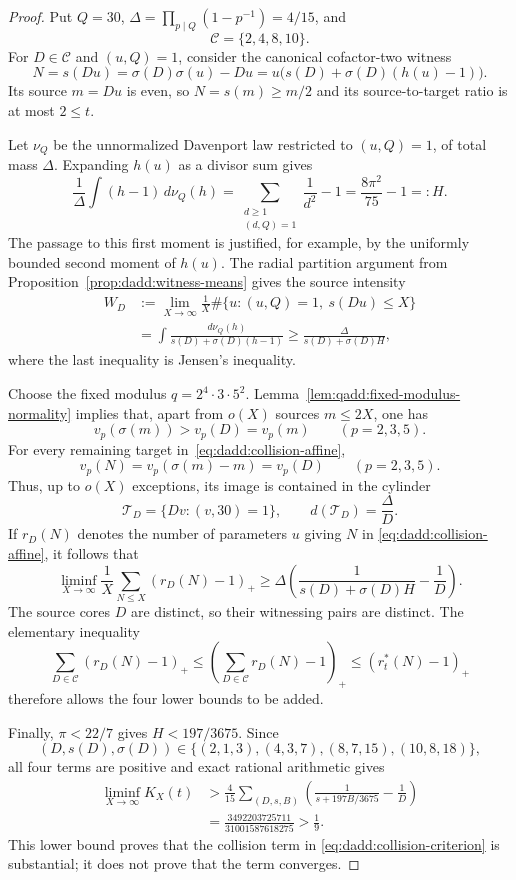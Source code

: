 \begin{proof}
Put $Q=30$, $\Delta=\prod_{p\mid Q}(1-p^{-1})=4/15$, and
\[
 \mathcal C=\{2,4,8,10\}.
\]
For $D\in\mathcal C$ and $(u,Q)=1$, consider the canonical
cofactor-two witness
\begin{equation}
\label{eq:dadd:collision-affine}
 N=s(Du)=\sigma(D)\sigma(u)-Du
        =u\bigl(s(D)+\sigma(D)(h(u)-1)\bigr).
\end{equation}
Its source $m=Du$ is even, so $N=s(m)\geq m/2$ and its
source-to-target ratio is at most $2\leq t$.

Let $\nu_Q$ be the unnormalized Davenport law restricted to
$(u,Q)=1$, of total mass $\Delta$. Expanding $h(u)$ as a divisor
sum gives
\[
 \frac1\Delta\int(h-1)\,d\nu_Q(h)
 =\sum_{\substack{d\geq1\\(d,Q)=1}}\frac1{d^2}-1
 =\frac{8\pi^2}{75}-1=:H.
\]
The passage to this first moment is justified, for example, by
the uniformly bounded second moment of $h(u)$. The radial
partition argument from Proposition~\ref{prop:dadd:witness-means}
gives the source intensity
\begin{align*}
 W_D
 &:=\lim_{X\to\infty}\frac1X
       \#\{u:(u,Q)=1,\ s(Du)\leq X\}\\
 &=\int\frac{d\nu_Q(h)}{s(D)+\sigma(D)(h-1)}
 \geq\frac{\Delta}{s(D)+\sigma(D)H},
\end{align*}
where the last inequality is Jensen's inequality.

Choose the fixed modulus $q=2^4\cdot3\cdot5^2$.
Lemma~\ref{lem:qadd:fixed-modulus-normality} implies that, apart
from $o(X)$ sources $m\leq2X$, one has
\[
 v_p(\sigma(m))>v_p(D)=v_p(m)
 \qquad(p=2,3,5).
\]
For every remaining target in~\eqref{eq:dadd:collision-affine},
\[
 v_p(N)=v_p(\sigma(m)-m)=v_p(D)
 \qquad(p=2,3,5).
\]
Thus, up to $o(X)$ exceptions, its image is contained in the
cylinder
\[
 \mathcal T_D=\{Dv:(v,30)=1\},
 \qquad d(\mathcal T_D)=\frac\Delta D.
\]
If $r_D(N)$ denotes the number of parameters $u$ giving $N$ in
\eqref{eq:dadd:collision-affine}, it follows that
\[
 \liminf_{X\to\infty}\frac1X
       \sum_{N\leq X}(r_D(N)-1)_+
 \geq\Delta\left(
      \frac1{s(D)+\sigma(D)H}-\frac1D\right).
\]
The source cores $D$ are distinct, so their witnessing pairs are
distinct. The elementary inequality
\[
 \sum_{D\in\mathcal C}(r_D(N)-1)_+
 \leq\left(\sum_{D\in\mathcal C}r_D(N)-1\right)_+
 \leq(r_t^*(N)-1)_+
\]
therefore allows the four lower bounds to be added.

Finally, $\pi<22/7$ gives $H<197/3675$. Since
\[
 (D,s(D),\sigma(D))
 \in\{(2,1,3),(4,3,7),(8,7,15),(10,8,18)\},
\]
all four terms are positive and exact rational arithmetic gives
\begin{align*}
 \liminf_{X\to\infty}K_X(t)
 &>
 \frac4{15}
 \sum_{(D,s,B)}
     \left(\frac1{s+197B/3675}-\frac1D\right)\\
 &=\frac{3492203725711}{31001587618275}
  >\frac19.
\end{align*}
This lower bound proves that the collision term in
\eqref{eq:dadd:collision-criterion} is substantial; it does not
prove that the term converges.
\end{proof}

